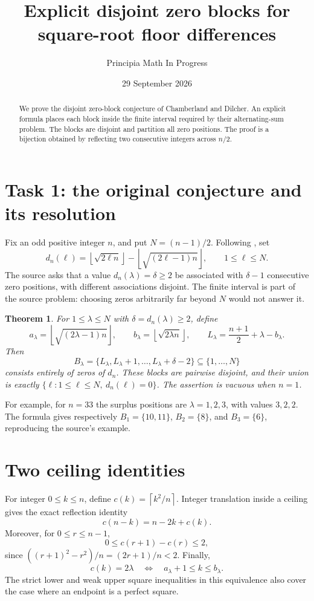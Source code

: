 \documentclass[11pt]{article}
\title{Explicit disjoint zero blocks for square-root floor differences}
\author{Principia Math In Progress}
\date{29 September 2026}
\newtheorem{theorem}{Theorem}
\newcommand{\fl}[1]{\left\lfloor #1\right\rfloor}
\newcommand{\cl}[1]{\left\lceil #1\right\rceil}
\begin{document}
\maketitle
\begin{abstract}
We prove the disjoint zero-block conjecture of Chamberland and Dilcher.
An explicit formula places each block inside the finite interval required
by their alternating-sum problem. The blocks are disjoint and partition
all zero positions. The proof is a bijection obtained by reflecting two
consecutive integers across $n/2$.
\end{abstract}

\section*{Task 1: the original conjecture and its resolution}
Fix an odd positive integer $n$, and put $N=(n-1)/2$. Following
\cite[Equation (2.3) and Conjecture 2.1]{CD}, set
\[
 d_n(\ell)=\fl{\sqrt{2\ell n}}-\fl{\sqrt{(2\ell-1)n}},
 \qquad 1\le\ell\le N.
\]
The source asks that a value $d_n(\lambda)=\delta\ge2$ be associated
with $\delta-1$ consecutive zero positions, with different associations
disjoint. The finite interval is part of the source problem: choosing
zeros arbitrarily far beyond $N$ would not answer it.

\begin{theorem}\label{thm:blocks}
For $1\le\lambda\le N$ with $\delta=d_n(\lambda)\ge2$, define
\[
 a_\lambda=\fl{\sqrt{(2\lambda-1)n}},\qquad
 b_\lambda=\fl{\sqrt{2\lambda n}},\qquad
 L_\lambda=\frac{n+1}{2}+\lambda-b_\lambda.
\]
Then
\[
 B_\lambda=\{L_\lambda,L_\lambda+1,\ldots,L_\lambda+\delta-2\}
 \subseteq\{1,\ldots,N\}
\]
consists entirely of zeros of $d_n$. These blocks are pairwise disjoint,
and their union is exactly $\{\ell:1\le\ell\le N,\ d_n(\ell)=0\}$.
The assertion is vacuous when $n=1$.
\end{theorem}

For example, for $n=33$ the surplus positions are $\lambda=1,2,3$, with
values $3,2,2$. The formula gives respectively $B_1=\{10,11\}$,
$B_2=\{8\}$, and $B_3=\{6\}$, reproducing the source's example.

\section*{Two ceiling identities}
For integer $0\le k\le n$, define $c(k)=\cl{k^2/n}$. Integer translation
inside a ceiling gives the exact reflection identity
\begin{equation}\label{eq:reflection}
 c(n-k)=n-2k+c(k).
\end{equation}
Moreover, for $0\le r\le n-1$,
\begin{equation}\label{eq:gap}
 0\le c(r+1)-c(r)\le2,
\end{equation}
since $((r+1)^2-r^2)/n=(2r+1)/n<2$.
Finally,
\begin{equation}\label{eq:bucket}
 c(k)=2\lambda
 \quad\Longleftrightarrow\quad
 a_\lambda+1\le k\le b_\lambda.
\end{equation}
The strict lower and weak upper square inequalities in this equivalence
also cover the case where an endpoint is a perfect square.
\end{document}
